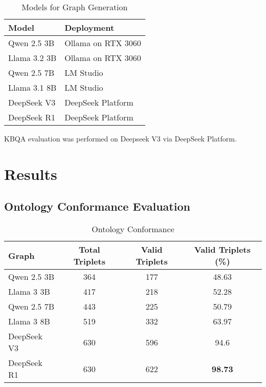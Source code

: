 \documentclass[a4, conference]{IEEEtran}
\begin{document}
\begin{table}[h]
    \centering
    \caption{Models for Graph Generation}
    \label{tab:model_deployment}
    \begin{tabular}{ll}
        \hline
        Model        & Deployment         \\
        \hline
        Qwen 2.5 3B  & Ollama on RTX 3060 \\
        Llama 3.2 3B & Ollama on RTX 3060 \\
        Qwen 2.5 7B  & LM Studio          \\
        Llama 3.1 8B & LM Studio          \\
        DeepSeek V3  & DeepSeek Platform  \\
        DeepSeek R1  & DeepSeek Platform  \\
        \hline
    \end{tabular}
\end{table}

KBQA evaluation was performed on Deepseek V3 via DeepSeek Platform.

\section{Results}

\subsection{Ontology Conformance Evaluation}

\begin{table}[h]
    \centering
    \caption{Ontology Conformance}
    \label{tab:oc_percent}
    \begin{tabular}{|l|c|c|c|}
        \hline
        Graph       & Total Triplets & Valid Triplets & Valid Triplets (\%) \\
        \hline
        Qwen 2.5 3B & 364            & 177            & 48.63               \\
        \hline
        Llama 3 3B  & 417            & 218            & 52.28               \\
        \hline
        Qwen 2.5 7B & 443            & 225            & 50.79               \\
        \hline
        Llama 3 8B  & 519            & 332            & 63.97               \\
        \hline
        DeepSeek V3 & 630            & 596            & 94.6                \\
        \hline
        DeepSeek R1 & 630            & 622            & \textbf{98.73}      \\
        \hline
    \end{tabular}
\end{table}
\end{document}
